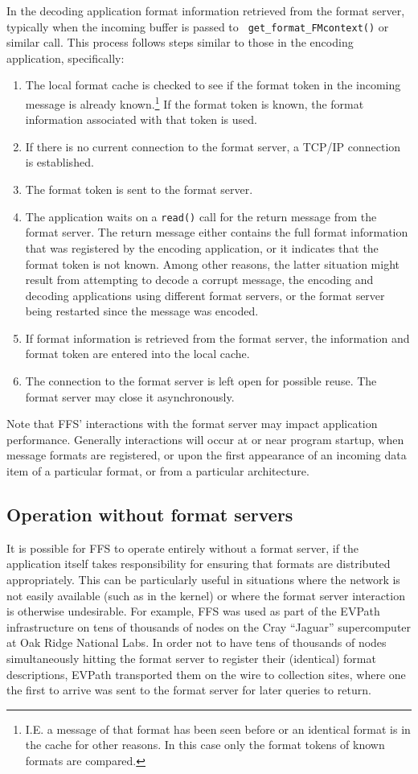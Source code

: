 In the decoding application format information retrieved from the format
server, typically when the incoming buffer is passed to {\tt
get\_format\_FMcontext()} or similar call.  This process follows steps
similar to those in the encoding application, specifically:
\begin{enumerate}
\item The local format cache is checked to see if the format token in the
incoming message is already known.\footnote{I.E. a message of that format
has been seen before or an identical format is in the cache for other
reasons.  In this case only the format tokens of known formats are
compared.}  If the format token is known, the format information associated
with that token is used.
\item If there is no current connection to the format server, a TCP/IP
connection is established.
\item The format token is sent to the format server.
\item The application waits on a {\tt read()} call for the return message
from the format server.  The return message either contains the full format
information that was registered by the encoding application, or it indicates
that the format token is not known.  Among other reasons, the latter
situation might result from attempting to decode a corrupt message, the
encoding and decoding applications using different format servers, or the
format server being restarted since the message was encoded.
\item If format information is retrieved from the format server, the
information and format token are entered into the local cache. 
\item The connection to the format server is left open for possible reuse.
The format server may close it asynchronously.
\end{enumerate}

Note that FFS' interactions with the format server may impact application
performance.  Generally interactions will occur at or near program startup,
when message formats are registered, or upon the first appearance of an
incoming data item of a particular format, or from a particular
architecture.

\subsection{Operation without format servers}
It is possible for FFS to operate entirely without a format server, if the
application itself takes responsibility for ensuring that formats are
distributed appropriately.  This can be particularly useful in situations
where the network is not easily available (such as in the kernel) or where
the format server interaction is otherwise undesirable.  For example, FFS
was used as part of the EVPath infrastructure\cite{hpdc09} on tens 
of thousands of nodes on the Cray ``Jaguar'' supercomputer at Oak Ridge
National Labs.  In order not to have tens of thousands of nodes
simultaneously hitting the format server to register their (identical)
format descriptions, EVPath transported them on the wire to collection
sites, where one the first to arrive was sent to the format server for later
queries to return.

